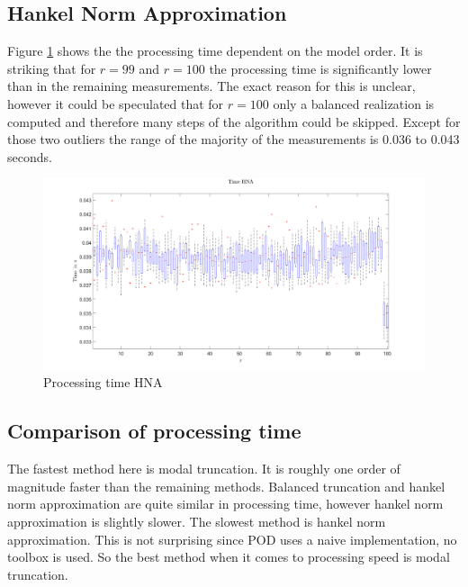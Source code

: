\subsection{Hankel Norm Approximation}
Figure \ref{FIG-T-HNA} shows the the processing time dependent on the model order.
It is striking that for \(r = 99\) and \(r = 100\) the processing time is significantly lower than in the remaining measurements.
The exact reason for this is unclear, however it could be speculated that for \(r=100\) only a balanced realization is computed and therefore many steps of the algorithm could be skipped.
Except for those two outliers the range of the majority of the measurements is 0.036 to 0.043 seconds.
\begin{figure}[H]
\centering
\includegraphics[width=\textwidth]{images/time/HNA}
\caption{Processing time HNA}
\label{FIG-T-HNA}
\end{figure}

\subsection{Comparison of processing time}
The fastest method here is modal truncation.
It is roughly one order of magnitude faster than the remaining methods.
Balanced truncation and hankel norm approximation are quite similar in processing time, however hankel norm approximation is slightly slower.
The slowest method is hankel norm approximation.
This is not surprising since POD uses a naive implementation, no toolbox is used.
So the best method when it comes to processing speed is modal truncation.









